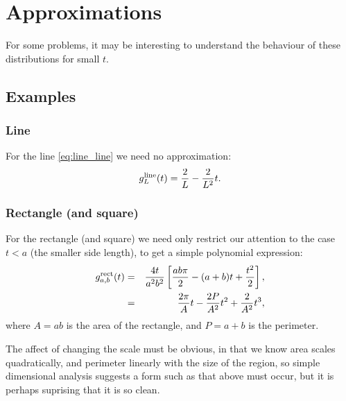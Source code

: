 


\section{Approximations}

For some problems, it may be interesting to understand the behaviour
of these distributions for small $t$. 

\subsection{Examples}

\subsubsection{Line}
For the line \eqref{eq:line_line} we need no approximation:
\begin{equation}
  g^{\rm line}_L(t) = \frac{2}{L} - \frac{2}{L^2} t.
\end{equation}

\subsubsection{Rectangle (and square)}
For the rectangle (and square) we need only restrict our attention to
the case $t<a$ (the smaller side length), to get a simple polynomial
expression: 
\begin{eqnarray}
  g^{\rm rect}_{a,b}(t) & = & 
           \frac{4 t}{a^2 b^2}  
         \left[ \frac{ab \pi}{2} - (a+b) t + \frac{t^2}{2} \right],
          \nonumber \\
                         & = & \frac{2 \pi}{A} t 
                              - \frac{2 P}{A^2} t^2
                              + \frac{2}{A^2} t^3,
\end{eqnarray}
where $A = ab$ is the area of the rectangle, and $P = a+b$ is the perimeter.

The affect of changing the scale must be obvious, in that we know area
scales quadratically, and perimeter linearly with the size of the
region, so simple dimensional analysis suggests a form such as that
above must occur, but it is perhaps suprising that it is so clean. 

